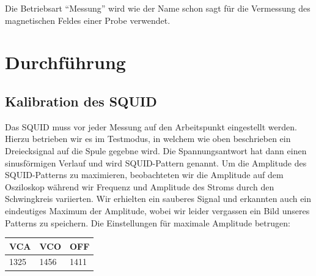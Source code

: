 \documentclass[12pt]{article}
\begin{document}
Die Betriebsart "`Messung"' wird wie der Name schon sagt für die Vermessung des magnetischen Feldes einer Probe verwendet.

\section{Durchführung}
\subsection{Kalibration des SQUID}
Das SQUID muss vor jeder Messung auf den Arbeitspunkt eingestellt werden. Hierzu betrieben wir es im Testmodus, in welchem wie oben beschrieben ein Dreiecksignal auf die Spule gegebne wird. Die Spannungsantwort hat dann einen sinusförmigen Verlauf und wird SQUID-Pattern genannt. Um die Amplitude des SQUID-Patterns zu maximieren, beobachteten wir die Amplitude auf dem Osziloskop während wir Frequenz und Amplitude des Stroms durch den Schwingkreis variierten. Wir erhielten ein sauberes Signal und erkannten auch ein eindeutiges Maximum der Amplitude, wobei wir leider vergassen ein Bild unseres Patterns zu speichern. Die Einstellungen für maximale Amplitude betrugen:
\begin{center}
\begin{tabular}{|l|l|l|}
\hline
VCA & VCO & OFF \\ 
\hline
1325 & 1456 & 1411 \\ 
\hline
\end{tabular}
\end{center}
\end{document}
